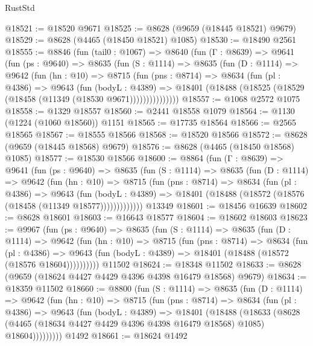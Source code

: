 \begin{lexlean}{RustStd}
\begin{coremodule}
@18521 := @18520 @9671
@18525 := @8628 (@9659 (@18445 @18521) @9679)
@18529 := @8628 (@4465 (@18450 @18521) @1085)
@18530 := @18490 @2561
@18555 := @8846
    (fun (tail0 : @1067) =>
    @8640
      (fun (Γ : @8639) =>
      @9641
        (fun (ps : @9640) =>
        @8635
          (fun (S : @1114) =>
          @8635
            (fun (D : @1114) =>
            @9642
              (fun (hn : @10) =>
              @8715
                (fun (pns : @8714) =>
                @8634
                  (fun (pl : @4386) =>
                  @9643
                    (fun (bodyL : @4389) =>
                    @18401 (@18488 (@18525 (@18529 (@18458 (@11349 (@18530 @9671)))))))))))))))
@18557 := @1068 @2572 @1075
@18558 := @1329 @18557
@18560 := @2441 @18558 @1079
@18564 := @1130 (@1224 (@1060 @18560)) @1151
@18565 := @17735 @18564
@18566 := @2565 @18565
@18567 := @18555 @18566
@18568 := @18520 @18566
@18572 := @8628 (@9659 (@18445 @18568) @9679)
@18576 := @8628 (@4465 (@18450 @18568) @1085)
@18577 := @18530 @18566
@18600 := @8864
    (fun (Γ : @8639) =>
    @9641
      (fun (ps : @9640) =>
      @8635
        (fun (S : @1114) =>
        @8635
          (fun (D : @1114) =>
          @9642
            (fun (hn : @10) =>
            @8715
              (fun (pns : @8714) =>
              @8634
                (fun (pl : @4386) =>
                @9643
                  (fun (bodyL : @4389) =>
                  @18401 (@18488 (@18572 (@18576 (@18458 (@11349 @18577)))))))))))))
    @13349
@18601 := @18456 @16639
@18602 := @8628 @18601
@18603 := @16643 @18577
@18604 := @18602 @18603
@18623 := @9967
    (fun (ps : @9640) =>
    @8635
      (fun (S : @1114) =>
      @8635
        (fun (D : @1114) =>
        @9642
          (fun (hn : @10) =>
          @8715
            (fun (pns : @8714) =>
            @8634
              (fun (pl : @4386) =>
              @9643 (fun (bodyL : @4389) => @18401 (@18488 (@18572 (@18576 @18604))))))))))
    @11502
@18624 := @18348 @11502
@18633 := @8628 (@9659 (@18624 @4427 @4429 @4396 @4398 @16479 @18568) @9679)
@18634 := @18359 @11502
@18660 := @8800
    (fun (S : @1114) =>
    @8635
      (fun (D : @1114) =>
      @9642
        (fun (hn : @10) =>
        @8715
          (fun (pns : @8714) =>
          @8634
            (fun (pl : @4386) =>
            @9643
              (fun (bodyL : @4389) =>
              @18401
                (@18488
                  (@18633
                    (@8628
                      (@4465 (@18634 @4427 @4429 @4396 @4398 @16479 @18568) @1085)
                      @18604)))))))))
    @1492
@18661 := @18624 @1492

\end{coremodule}
\end{lexlean}
